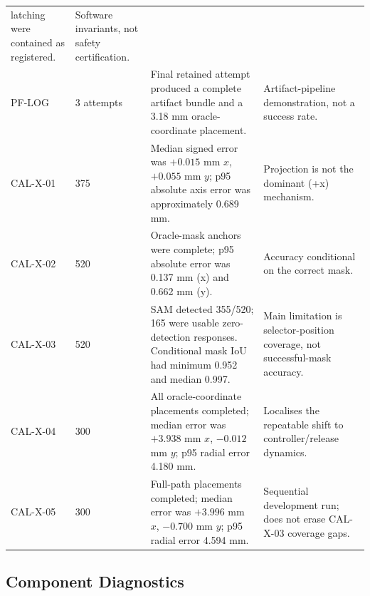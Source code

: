 \documentclass{article}
\begin{document}
{\begin{longtable}{@{}P{2.25cm}P{1.40cm}P{6.05cm}P{4.95cm}@{}}
    latching were contained as registered. & Software invariants, not safety
    certification. \\
    PF-LOG & 3 attempts & Final retained attempt produced a complete artifact
    bundle and a 3.18 mm oracle-coordinate placement. & Artifact-pipeline
    demonstration, not a success rate. \\
    CAL-X-01 & 375 & Median signed error was $+0.015$ mm $x$, $+0.055$ mm
    $y$; p95 absolute axis error was approximately 0.689 mm. & Projection is
    not the dominant (+x) mechanism. \\
    CAL-X-02 & 520 & Oracle-mask anchors were complete; p95 absolute error was
    0.137 mm (x) and 0.662 mm (y). & Accuracy conditional on the correct
    mask. \\
    CAL-X-03 & 520 & SAM detected 355/520; 165 were usable zero-detection
    responses. Conditional mask IoU had minimum 0.952 and median 0.997. & Main
    limitation is selector-position coverage, not successful-mask accuracy. \\
    CAL-X-04 & 300 & All oracle-coordinate placements completed; median error was
    $+3.938$ mm $x$, $-0.012$ mm $y$; p95 radial error 4.180 mm. &
    Localises the repeatable shift to controller/release dynamics. \\
    CAL-X-05 & 300 & Full-path placements completed; median error was $+3.996$
    mm $x$, $-0.700$ mm $y$; p95 radial error 4.594 mm. & Sequential
    development run; does not erase CAL-X-03 coverage gaps. \\
\end{longtable}
}

\subsection{Component Diagnostics}
\end{document}
